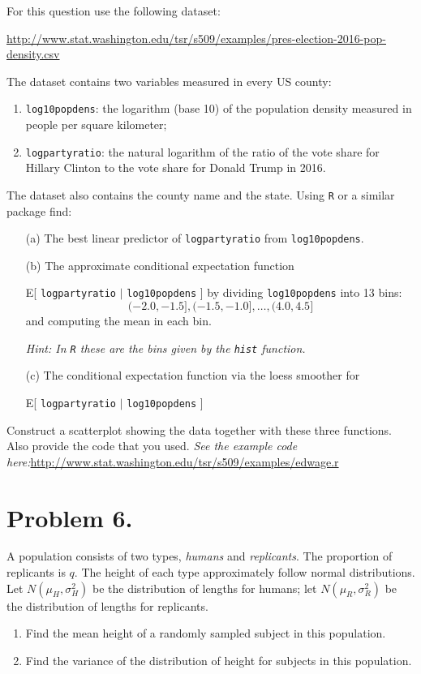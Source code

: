 \documentclass{article}
\newcommand{\1}{\mathbf{1}}
\begin{document}
For this question use the following dataset:\par
{\scriptsize \url{http://www.stat.washington.edu/tsr/s509/examples/pres-election-2016-pop-density.csv}}\par
The dataset contains two variables measured in every US county:
\begin{enumerate}
    \item {\tt log10popdens}: the logarithm (base 10) of the population density measured in people per square kilometer;
    \item{\tt logpartyratio}: the natural logarithm of the ratio of the vote share for Hillary Clinton to the vote share for Donald Trump in 2016.
\end{enumerate}
The dataset also contains the county name and the state. Using {\tt R} or a similar package find:
\begin{enumerate}
    \item[(a)] The best linear predictor of {\tt logpartyratio} from  {\tt log10popdens}.
    \item[(b)] The approximate conditional expectation function\par
        E[ {\tt logpartyratio} $|$ {\tt log10popdens} ] by dividing {\tt log10popdens} into 13 bins:
        $$(-2.0,-1.5], (-1.5,-1.0], \ldots ,(4.0,4.5]$$
        and computing the mean in each bin.\par
        {\it Hint: In {\tt R} these are the bins given by the {\tt hist} function.}
    \item[(c)] The conditional expectation function via the loess smoother for\par
        E[ {\tt logpartyratio} $|$ {\tt log10popdens} ]
\end{enumerate}
Construct a scatterplot showing the data together with these three functions. Also provide the code that you used. {\it  See the example code here:}\url{http://www.stat.washington.edu/tsr/s509/examples/edwage.r}



\newpage
\section*{Problem 6.}
A population consists of two types, {\it humans} and {\it replicants}. The proportion of replicants is $q$. The height of each type approximately follow normal distributions. Let $N(\mu_H,\sigma^2_H)$ be the distribution of lengths for humans; let $N(\mu_R,\sigma^2_R)$ be the distribution of lengths for replicants.
\begin{enumerate}
    \item Find the mean height of a randomly sampled subject in this population.
    \item Find the variance of the distribution of height for subjects in this population.
\end{enumerate}
\end{document}
